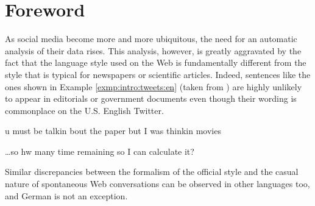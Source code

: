 

\chapter*{Foreword}

As social media become more and more ubiquitous, the need for an
automatic analysis of their data rises.  This analysis, however, is
greatly aggravated by the fact that the language style used on the Web
is fundamentally different from the style that is typical for
newspapers or scientific articles.  Indeed, sentences like the ones
shown in Example \ref{exmp:intro:tweets:en} (taken from
\citet{HanBaldwin:11}) are highly unlikely to appear in editorials or
government documents even though their wording is commonplace on the
U.S. English Twitter.
\begin{example}\label{exmp:intro:tweets:en}
u must be talkin bout the paper but I was thinkin movies

\dots so hw many time remaining so I can calculate it?
\end{example}
Similar discrepancies between the formalism of the official style and the
casual nature of spontaneous Web conversations can be observed in other
languages too, and German is not an exception.

